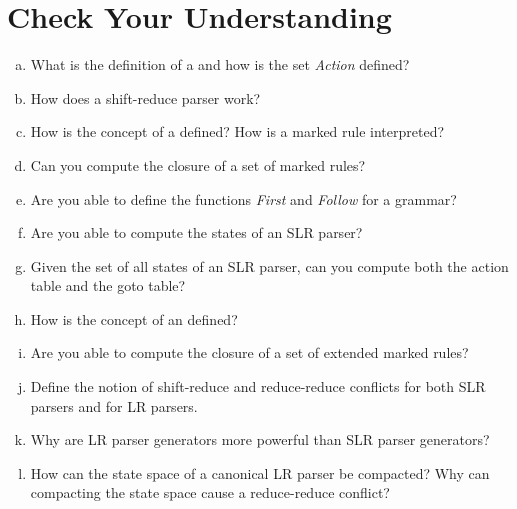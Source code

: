 \section{Check Your Understanding}
\begin{enumerate}[(a)]
\item What is the definition of a  and how is the set \textsl{Action} defined?
\item How does a shift-reduce parser work?
\item How is the concept of a  defined?  How is a marked rule interpreted?
\item Can you compute the closure of a set of marked rules?
\item Are you able to define the functions \textsl{First} and \textsl{Follow} for a grammar?
\item Are you able to compute the states of an SLR parser?
\item Given the set of all states of an SLR parser, can you compute both the action table and the goto
      table? 
\item How is the concept of an  defined?
\item Are you able to compute the closure of a set of extended marked rules?
\item Define the notion of shift-reduce and reduce-reduce conflicts for both SLR parsers and for
      LR parsers. 
\item Why are LR parser generators more powerful than SLR parser generators?
\item How can the state space of a canonical LR parser be compacted?  Why can compacting the state space cause a
      reduce-reduce conflict?
\end{enumerate}


